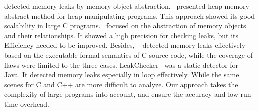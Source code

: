 \cite{DWC12,XR08} detected memory leaks by memory-object abstraction.~\cite{DWC12} presented heap memory abstract method for heap-manipulating programs. This approach showed its good scalability in large C programs.~\cite{XR08} focused on the abstraction of memory objects and their relationships. It showed a high precision for checking leaks, but its Efficiency needed to be improved. Besides, ~\cite{LXL15} detected memory leaks effectively based on the executable formal semantics of C source code, while the coverage of flaws were limited to the three cases. LeakChecker~\cite{YXYR14} was a static detector for Java. It detected memory leaks especially in loop effectively. While the same scenes for C and C++ are more difficult to analyze. Our approach takes the complexity of large programs into account, and ensure the accuracy and low run-time overhead.

